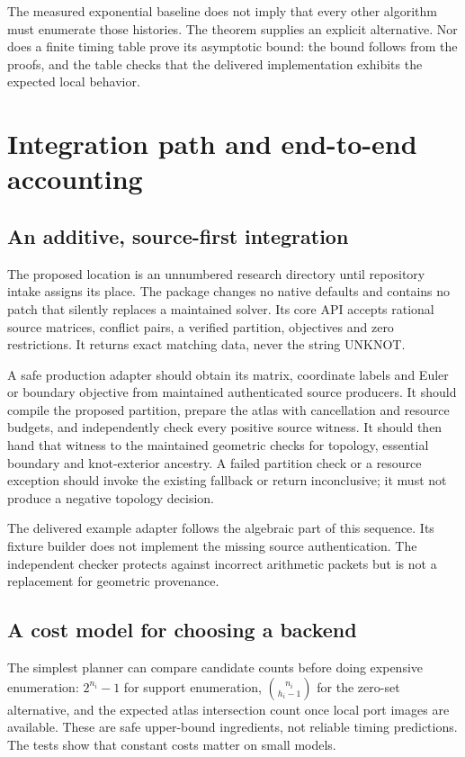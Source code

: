 \documentclass[11pt,a4paper]{article}
\theoremstyle{definition}
\theoremstyle{remark}
\begin{document}
The measured exponential baseline does not imply that every other algorithm must enumerate those histories. The theorem supplies an explicit alternative. Nor does a finite timing table prove its asymptotic bound: the bound follows from the proofs, and the table checks that the delivered implementation exhibits the expected local behavior.



\section{Integration path and end-to-end accounting}
\label{sec:integration}

\subsection{An additive, source-first integration}
The proposed location is an unnumbered research directory until repository intake assigns its place. The package changes no native defaults and contains no patch that silently replaces a maintained solver. Its core API accepts rational source matrices, conflict pairs, a verified partition, objectives and zero restrictions. It returns exact matching data, never the string \textsf{UNKNOT}.

A safe production adapter should obtain its matrix, coordinate labels and Euler or boundary objective from maintained authenticated source producers. It should compile the proposed partition, prepare the atlas with cancellation and resource budgets, and independently check every positive source witness. It should then hand that witness to the maintained geometric checks for topology, essential boundary and knot-exterior ancestry. A failed partition check or a resource exception should invoke the existing fallback or return inconclusive; it must not produce a negative topology decision.

The delivered example adapter follows the algebraic part of this sequence. Its fixture builder does not implement the missing source authentication. The independent checker protects against incorrect arithmetic packets but is not a replacement for geometric provenance.

\subsection{A cost model for choosing a backend}
The simplest planner can compare candidate counts before doing expensive enumeration: $2^{n_i}-1$ for support enumeration, $\binom{n_i}{h_i-1}$ for the zero-set alternative, and the expected atlas intersection count once local port images are available. These are safe upper-bound ingredients, not reliable timing predictions. The tests show that constant costs matter on small models.
\end{document}

